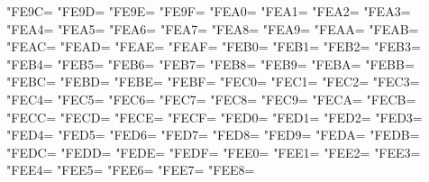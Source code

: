 \XeTeXcharclass"FE9C=\KclassArabU
\XeTeXcharclass"FE9D=\KclassArabU
\XeTeXcharclass"FE9E=\KclassArabU
\XeTeXcharclass"FE9F=\KclassArabU
\XeTeXcharclass"FEA0=\KclassArabU
\XeTeXcharclass"FEA1=\KclassArabU
\XeTeXcharclass"FEA2=\KclassArabU
\XeTeXcharclass"FEA3=\KclassArabU
\XeTeXcharclass"FEA4=\KclassArabU
\XeTeXcharclass"FEA5=\KclassArabU
\XeTeXcharclass"FEA6=\KclassArabU
\XeTeXcharclass"FEA7=\KclassArabU
\XeTeXcharclass"FEA8=\KclassArabU
\XeTeXcharclass"FEA9=\KclassArabU
\XeTeXcharclass"FEAA=\KclassArabU
\XeTeXcharclass"FEAB=\KclassArabU
\XeTeXcharclass"FEAC=\KclassArabU
\XeTeXcharclass"FEAD=\KclassArabU
\XeTeXcharclass"FEAE=\KclassArabU
\XeTeXcharclass"FEAF=\KclassArabU
\XeTeXcharclass"FEB0=\KclassArabU
\XeTeXcharclass"FEB1=\KclassArabU
\XeTeXcharclass"FEB2=\KclassArabU
\XeTeXcharclass"FEB3=\KclassArabU
\XeTeXcharclass"FEB4=\KclassArabU
\XeTeXcharclass"FEB5=\KclassArabU
\XeTeXcharclass"FEB6=\KclassArabU
\XeTeXcharclass"FEB7=\KclassArabU
\XeTeXcharclass"FEB8=\KclassArabU
\XeTeXcharclass"FEB9=\KclassArabU
\XeTeXcharclass"FEBA=\KclassArabU
\XeTeXcharclass"FEBB=\KclassArabU
\XeTeXcharclass"FEBC=\KclassArabU
\XeTeXcharclass"FEBD=\KclassArabU
\XeTeXcharclass"FEBE=\KclassArabU
\XeTeXcharclass"FEBF=\KclassArabU
\XeTeXcharclass"FEC0=\KclassArabU
\XeTeXcharclass"FEC1=\KclassArabU
\XeTeXcharclass"FEC2=\KclassArabU
\XeTeXcharclass"FEC3=\KclassArabU
\XeTeXcharclass"FEC4=\KclassArabU
\XeTeXcharclass"FEC5=\KclassArabU
\XeTeXcharclass"FEC6=\KclassArabU
\XeTeXcharclass"FEC7=\KclassArabU
\XeTeXcharclass"FEC8=\KclassArabU
\XeTeXcharclass"FEC9=\KclassArabU
\XeTeXcharclass"FECA=\KclassArabU
\XeTeXcharclass"FECB=\KclassArabU
\XeTeXcharclass"FECC=\KclassArabU
\XeTeXcharclass"FECD=\KclassArabU
\XeTeXcharclass"FECE=\KclassArabU
\XeTeXcharclass"FECF=\KclassArabU
\XeTeXcharclass"FED0=\KclassArabU
\XeTeXcharclass"FED1=\KclassArabU
\XeTeXcharclass"FED2=\KclassArabU
\XeTeXcharclass"FED3=\KclassArabU
\XeTeXcharclass"FED4=\KclassArabU
\XeTeXcharclass"FED5=\KclassArabU
\XeTeXcharclass"FED6=\KclassArabU
\XeTeXcharclass"FED7=\KclassArabU
\XeTeXcharclass"FED8=\KclassArabU
\XeTeXcharclass"FED9=\KclassArabU
\XeTeXcharclass"FEDA=\KclassArabU
\XeTeXcharclass"FEDB=\KclassArabU
\XeTeXcharclass"FEDC=\KclassArabU
\XeTeXcharclass"FEDD=\KclassArabU
\XeTeXcharclass"FEDE=\KclassArabU
\XeTeXcharclass"FEDF=\KclassArabU
\XeTeXcharclass"FEE0=\KclassArabU
\XeTeXcharclass"FEE1=\KclassArabU
\XeTeXcharclass"FEE2=\KclassArabU
\XeTeXcharclass"FEE3=\KclassArabU
\XeTeXcharclass"FEE4=\KclassArabU
\XeTeXcharclass"FEE5=\KclassArabU
\XeTeXcharclass"FEE6=\KclassArabU
\XeTeXcharclass"FEE7=\KclassArabU
\XeTeXcharclass"FEE8=\KclassArabU
